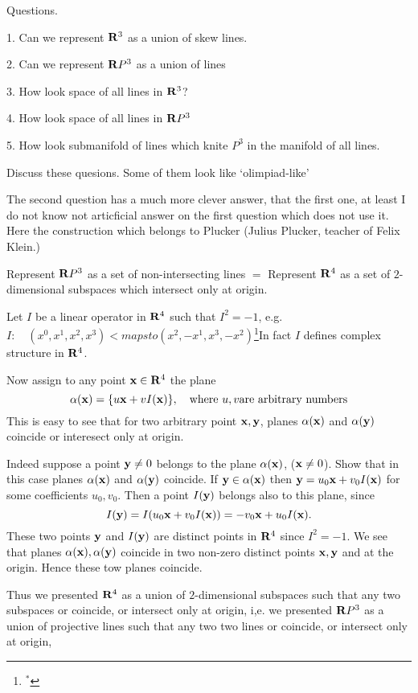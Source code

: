 

\def\a{\alpha}
\def\x{{\bf x}}
\def\y{{\bf y}}
\def\R {{\bf R}}
    Questions.


1. Can we represent $\R^3$ as a union of skew lines.


2. Can we represent $\R P^3$ as a union of lines


3. How look space of all lines in $\R^3$?

4.  How look space of all lines in $\R P^3$

5. How look submanifold of lines which knite $P^3$
in the manifold of all lines.


   Discuss these quesions. Some of them look
 like `olimpiad-like'


  The second question has a much more clever answer, that the first one, 
at least I do not know not articficial answer on the first question which does 
not use it. Here the construction which belongs to Plucker 
(Julius Plucker, teacher of Felix Klein.)


  Represent $\R P^3$ as a set of non-intersecting 
lines $=$  Represent $\R ^4$ as a set of $2$-dimensional subspaces
 which intersect only  at origin.

\smallskip

Let $I$ be a linear operator in $\R^4$ such that $I^2=-1$, e.g. 
$I\colon \quad(x^0,x^1, x^2,x^3)<mapsto (x^2,-x^1, x^3,-x^2)$\footnote{$^*$}{In fact $I$ 
defines complex structure in $\R^4$.}


   Now assign to any point $\x\in \R^4$ the plane
                           $$
                  \a(\x)=\{u\x+v I(\x)\}, \quad {\rm where}\,\, u,v \hbox {are arbitrary numbers}
                           $$
This is easy to see that for two arbitrary point $\x,\y$,
 planes $\a(\x)$ and $\a(\y)$ coincide
or interesect only at origin.

   Indeed suppose a point $\y\not=0$ belongs to the plane $\a(\x)$, 
($\x\not=0$). Show that in this case planes $\a(\x)$ and $\a(\y)$ 
coincide.
   If $\y\in \a(\x)$ then
  $\y=u_0\x+v_0 I(\x)$ for some coefficients $u_0,v_0$. Then
  a point $I(\y)$ belongs also to this plane, since
                                  $$
  I(\y)=I(u_0\x+v_0 I(\x))=-v_0\x+u_0 I(\x).
                                  $$
These two points $\y$ and $I(\y)$ are distinct points in $\R^4$ 
since $I^2=-1$.  We see that planes $\a(\x), \a(\y)$ 
coincide in two non-zero distinct points $\x,\y$ and at the origin. Hence
these tow planes coincide. 


 Thus we presented $\R^4$ as a union of $2$-dimensional subspaces such that
any two subspaces or coincide, or intersect only at origin,
i,e. we  presented $\R P^3$ as a union of projective lines  such that
any two two lines or coincide, or intersect only at origin,

